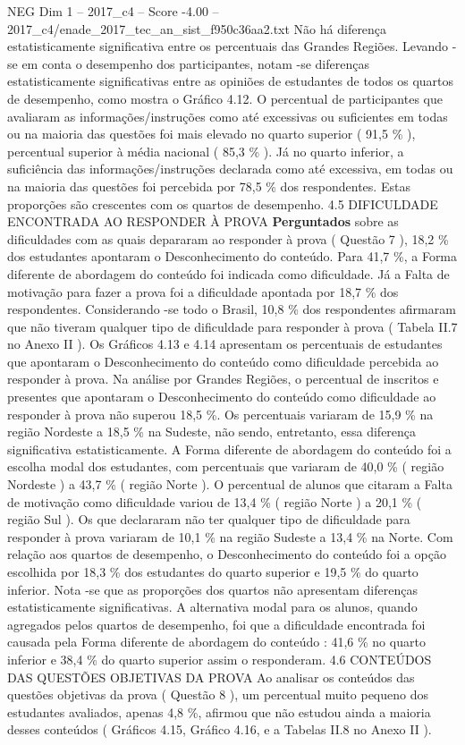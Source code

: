 \begin{textsample}{NEG Dim 1 – 2017\_c4 – Score -4.00 – 2017\_c4/enade\_2017\_tec\_an\_sist\_f950c36aa2.txt}
Não há diferença estatisticamente significativa entre os percentuais das Grandes Regiões.
Levando -se em conta o desempenho dos participantes, notam -se diferenças estatisticamente significativas entre as opiniões de estudantes de todos os quartos de desempenho, como mostra o Gráfico 4.12.
O percentual de participantes que avaliaram as informações/instruções como até excessivas ou suficientes em todas ou na maioria das questões foi mais elevado no quarto superior ( 91,5 \% ), percentual superior à média nacional ( 85,3 \% ).
Já no quarto inferior, a suficiência das informações/instruções declarada como até excessiva, em todas ou na maioria das questões foi percebida por 78,5 \% dos respondentes.
Estas proporções são crescentes com os quartos de desempenho. 4.5 DIFICULDADE ENCONTRADA AO RESPONDER À PROVA \textbf{Perguntados} sobre as dificuldades com as quais depararam ao responder à prova ( Questão 7 ), 18,2 \% dos estudantes apontaram o Desconhecimento do conteúdo.
Para 41,7 \%, a Forma diferente de abordagem do conteúdo foi indicada como dificuldade.
Já a Falta de motivação para fazer a prova foi a dificuldade apontada por 18,7 \% dos respondentes.
Considerando -se todo o Brasil, 10,8 \% dos respondentes afirmaram que não tiveram qualquer tipo de dificuldade para responder à prova ( Tabela II.7 no Anexo II ).
Os Gráficos 4.13 e 4.14 apresentam os percentuais de estudantes que apontaram o Desconhecimento do conteúdo como dificuldade percebida ao responder à prova.
Na análise por Grandes Regiões, o percentual de inscritos e presentes que apontaram o Desconhecimento do conteúdo como dificuldade ao responder à prova não superou 18,5 \%.
Os percentuais variaram de 15,9 \% na região Nordeste a 18,5 \% na Sudeste, não sendo, entretanto, essa diferença significativa estatisticamente.
A Forma diferente de abordagem do conteúdo foi a escolha modal dos estudantes, com percentuais que variaram de 40,0 \% ( região Nordeste ) a 43,7 \% ( região Norte ).
O percentual de alunos que citaram a Falta de motivação como dificuldade variou de 13,4 \% ( região Norte ) a 20,1 \% ( região Sul ).
Os que declararam não ter qualquer tipo de dificuldade para responder à prova variaram de 10,1 \% na região Sudeste a 13,4 \% na Norte.
Com relação aos quartos de desempenho, o Desconhecimento do conteúdo foi a opção escolhida por 18,3 \% dos estudantes do quarto superior e 19,5 \% do quarto inferior.
Nota -se que as proporções dos quartos não apresentam diferenças estatisticamente significativas.
A alternativa modal para os alunos, quando agregados pelos quartos de desempenho, foi que a dificuldade encontrada foi causada pela Forma diferente de abordagem do conteúdo : 41,6 \% no quarto inferior e 38,4 \% do quarto superior assim o responderam. 4.6 CONTEÚDOS DAS QUESTÕES OBJETIVAS DA PROVA Ao analisar os conteúdos das questões objetivas da prova ( Questão 8 ), um percentual muito pequeno dos estudantes avaliados, apenas 4,8 \%, afirmou que não estudou ainda a maioria desses conteúdos ( Gráficos 4.15, Gráfico 4.16, e a Tabelas II.8 no Anexo II ).

\end{textsample}
